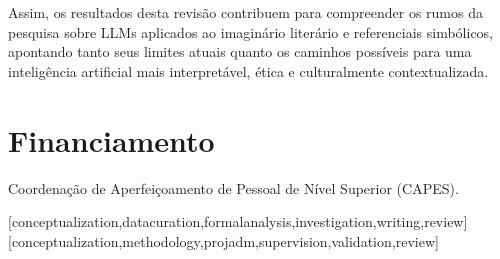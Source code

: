 \documentclass[portuguese]{textolivre}
\begin{document}
Assim, os resultados desta revisão contribuem para compreender os rumos da pesquisa sobre LLMs aplicados ao imaginário literário e referenciais simbólicos, apontando tanto seus limites atuais quanto os caminhos possíveis para uma inteligência artificial mais interpretável, ética e culturalmente contextualizada.

\section*{Financiamento}
Coordenação de Aperfeiçoamento de Pessoal de Nível Superior (CAPES).



\printbibliography\label{sec-bib}


\begin{contributors}
[conceptualization,datacuration,formalanalysis,investigation,writing,review]
[conceptualization,methodology,projadm,supervision,validation,review]
\end{contributors}
\end{document}
